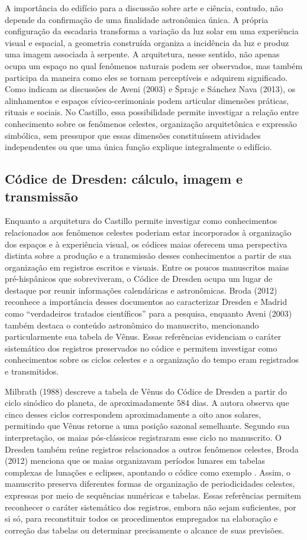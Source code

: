 \documentclass[11pt, a4paper]{article}
\begin{document}
A importância do edifício para a discussão sobre arte e ciência, contudo, não depende da confirmação de uma finalidade astronômica única. A própria configuração da escadaria transforma a variação da luz solar em uma experiência visual e espacial, a geometria construída organiza a incidência da luz e produz uma imagem associada à serpente. A arquitetura, nesse sentido, não apenas ocupa um espaço no qual fenômenos naturais podem ser observados, mas também participa da maneira como eles se tornam perceptíveis e adquirem significado. Como indicam as discussões de Aveni (2003) e Šprajc e Sánchez Nava (2013), os alinhamentos e espaços cívico-cerimoniais podem articular dimensões práticas, rituais e sociais. No Castillo, essa possibilidade permite investigar a relação entre conhecimento sobre os fenômenos celestes, organização arquitetônica e expressão simbólica, sem pressupor que essas dimensões constituíssem atividades independentes ou que uma única função explique integralmente o edifício.


\subsection{ Códice de Dresden: cálculo, imagem e transmissão}

Enquanto a arquitetura do Castillo permite investigar como conhecimentos relacionados aos fenômenos celestes poderiam estar incorporados à organização dos espaços e à experiência visual, os códices maias oferecem uma perspectiva distinta sobre a produção e a transmissão desses conhecimentos a partir de sua organização em registros escritos e visuais. Entre os poucos manuscritos maias pré-hispânicos que sobreviveram, o Códice de Dresden ocupa um lugar de destaque por reunir informações calendáricas e astronômicas. Broda (2012) reconhece a importância desses documentos ao caracterizar Dresden e Madrid como “verdadeiros tratados científicos” para a pesquisa, enquanto Aveni (2003) também destaca o conteúdo astronômico do manuscrito, mencionando particularmente sua tabela de Vênus. Essas referências evidenciam o caráter sistemático dos registros preservados no códice e permitem investigar como conhecimentos sobre os ciclos celestes e a organização do tempo eram registrados e transmitidos.

Milbrath (1988) descreve a tabela de Vênus do Códice de Dresden a partir do ciclo sinódico do planeta, de aproximadamente 584 dias. A autora observa que cinco desses ciclos correspondem aproximadamente a oito anos solares, permitindo que Vênus retorne a uma posição sazonal semelhante. Segundo sua interpretação, os maias pós-clássicos registraram esse ciclo no manuscrito. O Dresden também reúne registros relacionados a outros fenômenos celestes, Broda (2012) menciona que os maias organizavam períodos lunares em tabelas complexas de lunações e eclipses, apontando o códice como exemplo . Assim, o manuscrito preserva diferentes formas de organização de periodicidades celestes, expressas por meio de sequências numéricas e tabelas. Essas referências permitem reconhecer o caráter sistemático dos registros, embora não sejam suficientes, por si só, para reconstituir todos os procedimentos empregados na elaboração e correção das tabelas ou determinar precisamente o alcance de suas previsões.
\end{document}
